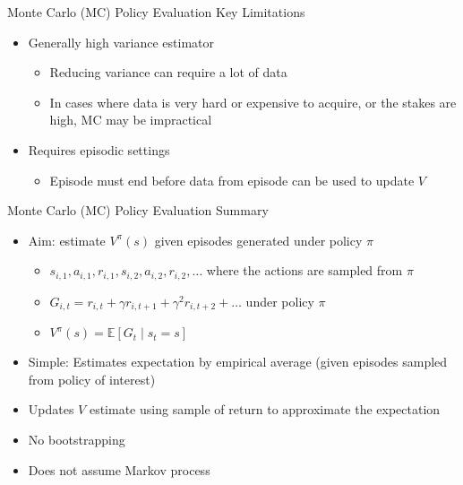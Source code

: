 \documentclass[aspectratio=169]{../latex_main/tntbeamer}  %
\begin{document}
\begin{frame}[c]{Monte Carlo (MC) Policy Evaluation Key Limitations}
	
	\begin{itemize}
		\item Generally high variance estimator
		\begin{itemize}
			\item Reducing variance can require a lot of data
			\item In cases where data is very hard or expensive to acquire, or the stakes are
			high, MC may be impractical
		\end{itemize}
		\medskip
		\pause
		\item Requires episodic settings
		\begin{itemize}
			\item Episode must end before data from episode can be used to update $V$

		\end{itemize}
		
	\end{itemize}
	
\end{frame}
\begin{frame}[c]{Monte Carlo (MC) Policy Evaluation Summary}
	
	\begin{itemize}
		\item Aim: estimate $V^\pi(s)$ given episodes generated under policy $\pi$
		\begin{itemize}
			\item $s_{i,1}, a_{i,1}, r_{i,1}, s_{i,2}, a_{i,2}, r_{i,2}, \ldots$ where the actions are sampled from $\pi$
			\item $G_{i,t} = r_{i,t} + \gamma r_{i,t+1} + \gamma^2 r_{i,t+2} + \ldots$ under policy $\pi$
			\item $V^\pi (s) = \mathbb{E}[G_t \mid s_t = s]$
		\end{itemize}
		\item Simple: Estimates expectation by empirical average (given episodes sampled from policy of interest)
		\item Updates $V$ estimate using sample of return to approximate the expectation
		\item No bootstrapping
		\item Does not assume Markov process
	\end{itemize}
	
\end{frame}

\end{document}
